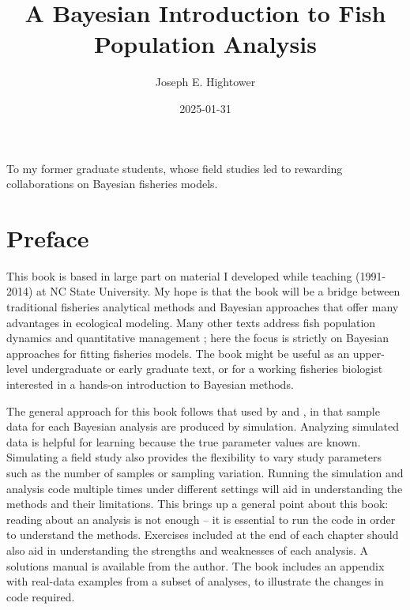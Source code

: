 \documentclass[
]{krantz}
\title{A Bayesian Introduction to Fish Population Analysis}
\author{Joseph E. Hightower}
\date{2025-01-31}
\begin{document}
\maketitle


\thispagestyle{empty}

\begin{center}
To my former graduate students,
whose field studies led to rewarding collaborations
on Bayesian fisheries models.
\end{center}

\setlength{\abovedisplayskip}{-5pt}
\setlength{\abovedisplayshortskip}{-5pt}

{
\hypersetup{linkcolor=}
\setcounter{tocdepth}{2}
\tableofcontents
}
\listoffigures
\hypertarget{preface}{%
\chapter*{Preface}\label{preface}}


This book is based in large part on material I developed while teaching (1991-2014) at NC State University. My hope is that the book will be a bridge between traditional fisheries analytical methods and Bayesian approaches that offer many advantages in ecological modeling. Many other texts address fish population dynamics and quantitative management \citep[e.g.,][]{hilborn.walters_1992, quinn.deriso_1999}; here the focus is strictly on Bayesian approaches for fitting fisheries models. The book might be useful as an upper-level undergraduate or early graduate text, or for a working fisheries biologist interested in a hands-on introduction to Bayesian methods.

The general approach for this book follows that used by \citet{kéry_2010} and \citet{kéry.schaub_2012}, in that sample data for each Bayesian analysis are produced by simulation. Analyzing simulated data is helpful for learning because the true parameter values are known. Simulating a field study also provides the flexibility to vary study parameters such as the number of samples or sampling variation. Running the simulation and analysis code multiple times under different settings will aid in understanding the methods and their limitations. This brings up a general point about this book: reading about an analysis is not enough -- it is essential to run the code in order to understand the methods. Exercises included at the end of each chapter should also aid in understanding the strengths and weaknesses of each analysis. A solutions manual is available from the author. The book includes an appendix with real-data examples from a subset of analyses, to illustrate the changes in code required.
\end{document}
